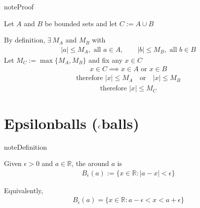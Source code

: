\documentclass[letterpaper,10pt,english]{jupyterBook}
\begin{document}
\begin{sphinxadmonition}{note}{Proof}

\sphinxAtStartPar
Let \(A\) and \(B\) be bounded sets and let \(C := A \cup B\)

\sphinxAtStartPar
By definition, \(\exists \, M_A\) and \(M_B\) with
\begin{equation*}
\begin{split}
|a| \leq M_A, \text{ all } a \in A, 
\quad \quad
|b| \leq M_B, \text{ all } b \in B
\end{split}
\end{equation*}
\sphinxAtStartPar
Let \(M_C := \max\{M_A , M_B\}\) and fix any \(x \in C\)
\begin{equation*}
\begin{split}
x \in C
\implies x \in A \text{ or } x \in B
\end{split}
\end{equation*}\begin{equation*}
\begin{split}
\text{therefore } |x| \leq M_A \quad \text{or} \quad |x| \leq M_B
\end{split}
\end{equation*}\begin{equation*}
\begin{split}
\text{therefore } |x| \leq M_C
\end{split}
\end{equation*}\end{sphinxadmonition}


\section{Epsilon\sphinxhyphen{}balls (\protect\(\epsilon\protect\)\sphinxhyphen{}balls)}
\label{\detokenize{04.basic_analysis:epsilon-balls-epsilon-balls}}
\begin{sphinxadmonition}{note}{Definition}

\sphinxAtStartPar
Given \(\epsilon > 0\) and \(a \in \mathbb{R}\), the 
around \(a\) is
\begin{equation*}
\begin{split}
B_{\epsilon}(a) 
:= \{ x \in \mathbb{R} : |a - x| < \epsilon \}
\end{split}
\end{equation*}\end{sphinxadmonition}

\sphinxAtStartPar
Equivalently,
\begin{equation*}
\begin{split}
B_\epsilon(a)
= \{ x \in \mathbb{R} :  a - \epsilon < x < a + \epsilon \}
\end{split}
\end{equation*}
\begin{figure}[htbp]
\centering

\noindent{}
\end{figure}
\end{document}
